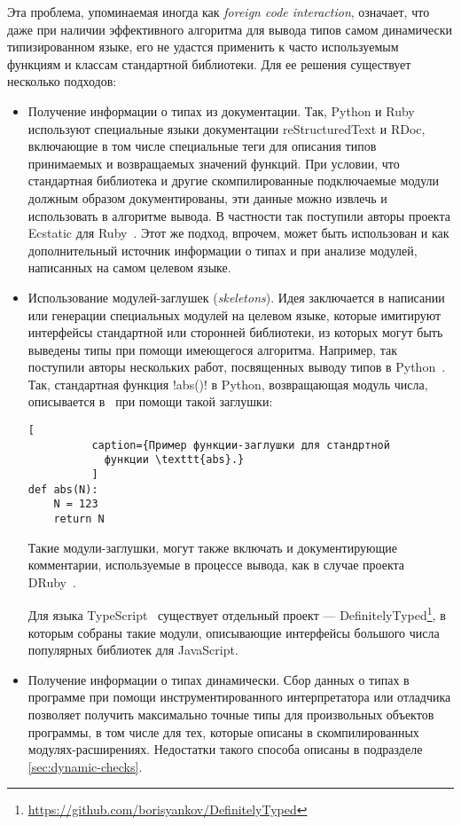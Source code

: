 Эта проблема, упоминаемая иногда как \emph{foreign code interaction}, означает, что даже при
наличии эффективного алгоритма для вывода типов самом динамически типизированном
языке, его не удастся применить к часто используемым функциям и классам
стандартной библиотеки. Для ее решения существует несколько подходов:

\begin{itemize}
    \item{%
        Получение информации о типах из документации.  Так, Python и Ruby
        используют специальные языки документации reStructuredText и RDoc,
        включающие в том числе специальные теги для описания типов принимаемых и
        возвращаемых значений функций. При условии, что стандартная библиотека и
        другие скомпилированные подключаемые модули должным образом
        документированы, эти данные можно извлечь и использовать в алгоритме
        вывода.  В частности так поступили авторы проекта Ecstatic для
        Ruby~\cite{Madsen2007}.  Этот же подход, впрочем, может быть использован
        и как дополнительный источник информации о типах и при анализе модулей,
        написанных на самом целевом языке.
      }
    \item{%
        Использование модулей-заглушек (\emph{skeletons}). Идея заключается в
        написании или генерации специальных модулей на целевом языке, которые
        имитируют интерфейсы стандартной или сторонней библиотеки,
        из которых могут быть выведены типы при помощи имеющегося алгоритма.
        Например, так поступили авторы нескольких работ, посвященных
        выводу типов в Python~\cite{Aycock2000,Salib2004}.  Так,
        стандартная функция !abs()! в Python, возвращающая модуль числа,
        описывается в~\cite{Aycock2000} при помощи такой заглушки:

        \begin{lstlisting}[
          caption={Пример функции-заглушки для стандртной
            функции \texttt{abs}.}
          ]
def abs(N):
    N = 123
    return N
        \end{lstlisting}

        Такие модули-заглушки, могут также включать и документирующие
        комментарии, используемые в процессе вывода, как в случае
        проекта DRuby~\cite{Furr2009}.
        
        Для языка TypeScript~\cite{TypeScript} существует отдельный проект ---
        DefinitelyTyped\footnote{\url{https://github.com/borisyankov/DefinitelyTyped}},
        в которым собраны такие модули, описывающие интерфейсы большого числа
        популярных библиотек для JavaScript.
      }
      \item{%
          Получение информации о типах динамически. Сбор данных о типах в
          программе при помощи инструментированного интерпретатора или отладчика
          позволяет получить максимально точные типы для произвольных объектов
          программы, в том числе для тех, которые описаны в скомпилированных
          модулях-расширениях. Недостатки такого способа описаны в подразделе
          \ref{sec:dynamic-checks}.
      }

\end{itemize}

